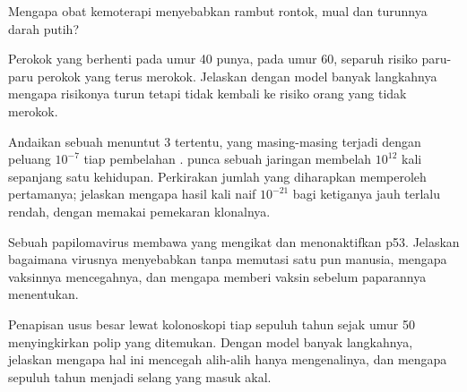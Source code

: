 \begin{exercise}[$\star\star$]\label{exo:g11:cancer:10}
Mengapa obat kemoterapi menyebabkan rambut rontok, mual dan turunnya
 darah putih?
\end{exercise}

\begin{exercise}[$\star\star$]\label{exo:g11:cancer:11}
Perokok yang berhenti pada umur 40 punya, pada umur 60, separuh risiko
 paru-paru perokok yang terus merokok. Jelaskan dengan model
banyak langkahnya mengapa risikonya turun tetapi tidak kembali ke
risiko orang yang tidak merokok.
\end{exercise}

\begin{exercise}[$\star\star\star$]\label{exo:g11:cancer:12}
Andaikan sebuah  menuntut 3  tertentu, yang masing-masing
terjadi dengan peluang $10^{-7}$ tiap pembelahan .  punca sebuah
jaringan membelah $10^{12}$ kali sepanjang satu kehidupan. Perkirakan
jumlah  yang diharapkan memperoleh  pertamanya; jelaskan
mengapa hasil kali naif $10^{-21}$ bagi ketiganya jauh terlalu rendah,
dengan memakai pemekaran klonalnya.
\end{exercise}

\begin{exercise}[$\star\star\star$]\label{exo:g11:cancer:13}
Sebuah papilomavirus membawa  yang  mengikat dan
menonaktifkan p53. Jelaskan bagaimana virusnya menyebabkan  tanpa
memutasi satu pun  manusia, mengapa vaksinnya mencegahnya, dan
mengapa memberi vaksin sebelum paparannya menentukan.
\end{exercise}

\begin{exercise}[$\star\star\star$]\label{exo:g11:cancer:14}
Penapisan  usus besar lewat kolonoskopi tiap sepuluh tahun sejak
umur 50 menyingkirkan polip yang ditemukan. Dengan model banyak
langkahnya, jelaskan mengapa hal ini mencegah  alih-alih hanya
mengenalinya, dan mengapa sepuluh tahun menjadi selang yang masuk akal.
\end{exercise}

